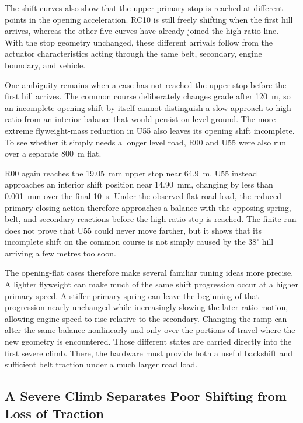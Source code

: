 \documentclass[11pt]{report}
\numberwithin{equation}{section}
\begin{document}
The shift curves also show that the upper primary stop is reached at different
points in the opening acceleration. RC10 is still freely shifting when the
first hill arrives, whereas the other five curves have already joined the
high-ratio line. With the stop geometry unchanged, these different arrivals
follow from the actuator characteristics acting through the same belt,
secondary, engine boundary, and vehicle.

One ambiguity remains when a case has not reached the upper stop before the
first hill arrives. The common course deliberately changes grade after
\SI{120}{m}, so an incomplete opening shift by itself cannot distinguish a
slow approach to high ratio from an interior balance that would persist on
level ground. The more extreme flyweight-mass reduction in U55 also leaves its
opening shift incomplete. To see whether it simply needs a longer level road,
R00 and U55 were also run over a separate \SI{800}{m} flat.

R00 again reaches the \SI{19.05}{mm} upper stop near \SI{64.9}{m}. U55 instead
approaches an interior shift position near \SI{14.90}{mm}, changing by less
than \SI{0.001}{mm} over the final \SI{10}{s}. Under the observed flat-road
load, the reduced primary closing action therefore approaches a balance with
the opposing spring, belt, and secondary reactions before the high-ratio stop
is reached. The finite run does not prove that U55 could never move farther,
but it shows that its incomplete shift on the common course is not simply
caused by the \(38^\circ\) hill arriving a few metres too soon.

The opening-flat cases therefore make several familiar tuning ideas more
precise. A lighter flyweight can make much of the same shift progression occur
at a higher primary speed. A stiffer primary spring can leave the beginning of
that progression nearly unchanged while increasingly slowing the later ratio
motion, allowing engine speed to rise relative to the secondary. Changing the
ramp can alter the same balance nonlinearly and only over the portions of
travel where the new geometry is encountered. Those different states are carried directly into the first severe
climb. There, the hardware must provide both a useful backshift and
sufficient belt traction under a much larger road load.

\subsection{A Severe Climb Separates Poor Shifting from Loss of Traction}
\label{sec:results_backshift}
\end{document}
